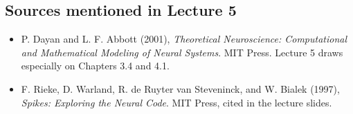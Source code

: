 \subsection*{Sources mentioned in Lecture 5}

\begin{itemize}
    \item P. Dayan and L. F. Abbott (2001), \emph{Theoretical Neuroscience: Computational and Mathematical Modeling of Neural Systems}. MIT Press. Lecture 5 draws especially on Chapters 3.4 and 4.1.
    \item F. Rieke, D. Warland, R. de Ruyter van Steveninck, and W. Bialek (1997), \emph{Spikes: Exploring the Neural Code}. MIT Press, cited in the lecture slides.
\end{itemize}
